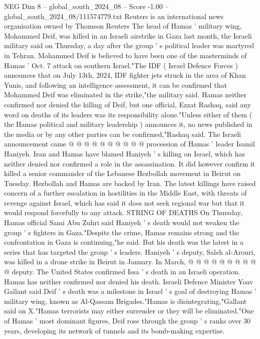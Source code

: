 \begin{textsample}{NEG Dim 8 – global\_south\_2024\_08 – Score -1.00 – global\_south\_2024\_08/111574779.txt}  \label{ex:f8_neg_072}
Reuters is an international news organisation owned by Thomson Reuters The head of Hamas ' military wing, Mohammed Deif, was killed in an Israeli airstrike in Gaza last month, the Israeli military said on Thursday, a day after the group ' s political leader was martyred in Tehran.
Mohammed Deif is believed to have been one of the masterminds of Hamas ' Oct. 7 attack on southern Israel."The IDF ( Israel Defence Forces ) announces that on July 13th, 2024, IDF fighter jets struck in the area of Khan Yunis, and following an intelligence assessment, it can be confirmed that Mohammed Deif was eliminated in the strike,"the military said.
Hamas neither confirmed nor denied the killing of Deif, but one official, Ezzat Rashaq, said any word on deaths of its leaders was its responsibility alone."Unless either of them ( the Hamas political and military leadership ) announces it, no news published in the media or by any other parties can be confirmed,"Rashaq said.
The Israeli announcement came @ @ @ @ @ @ @ @ @ @ procession of Hamas ' leader Isamil Haniyeh.
Iran and Hamas have blamed Haniyeh ' s killing on Israel, which has neither denied nor confirmed a role in the assassination.
It did however confirm it killed a senior commander of the Lebanese Hezbollah movement in Beirut on Tuesday.
Hezbollah and Hamas are backed by Iran.
The latest killings have raised concern of a further escalation in hostilities in the Middle East, with threats of revenge against Israel, which has said it does not seek regional war but that it would respond forcefully to any attack.
STRING OF DEATHS On Thursday, Hamas official Sami Abu Zuhri said Haniyeh ' s death would not weaken the group ' s fighters in Gaza."Despite the crime, Hamas remains strong and the confrontation in Gaza is continuing,"he said.
But his death was the latest in a series that has targeted the group ' s leaders.
Haniyeh ' s deputy, Saleh al-Arouri, was killed in a drone strike in Beirut in January.
In March, @ @ @ @ @ @ @ @ @ @ deputy.
The United States confirmed Issa ' s death in an Israeli operation.
Hamas has neither confirmed nor denied his death.
Israeli Defence Minister Yoav Gallant said Deif ' s death was a milestone in Israel ' s goal of destroying Hamas ' military wing, known as Al-Qassam Brigades."Hamas is disintegrating,"Gallant said on X."Hamas terrorists may either surrender or they will be eliminated."One of Hamas ' most dominant figures, Deif rose through the group ' s ranks over 30 years, developing its network of tunnels and its bomb-making expertise.

\end{textsample}
